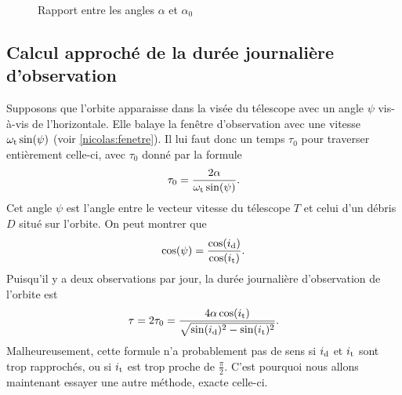 \begin{figure}
\begin{center}
\scriptsize
\def\figurewidth{0.6\linewidth}

\caption{Rapport entre les angles $\alpha$ et $\alpha_0$} \label{nicolas:alpha}
\end{center}
\end{figure}


\subsection{Calcul approché de la durée journalière d'observation}

Supposons que l'orbite apparaisse dans la visée du télescope avec un angle $\psi$ vis-à-vis de l'horizontale. Elle balaye la fenêtre d'observation avec une vitesse $\omega_\text{t} \sin(\psi)$ (voir \autoref{nicolas:fenetre}). Il lui faut donc un temps $\tau_0$ pour traverser entièrement celle-ci, avec $\tau_0$ donné par la formule
\[ \tau_0 = \frac{2\alpha}{\omega_\text{t} \sin(\psi)}.\]
Cet angle $\psi$ est l'angle entre le vecteur vitesse du télescope $T$ et celui d'un débris $D$ situé sur l'orbite. 
On peut montrer que
\[ 
\cos(\psi) = \frac{\cos(i_\text{d})}{\cos(i_\text{t})}.
\]
Puisqu'il y a deux observations par jour, la durée journalière d'observation de l'orbite est
\[ \tau = 2\tau_0 = \frac{4\alpha\cos(i_\text{t})}{\sqrt{\sin(i_\text{d})^2 - \sin(i_\text{t})^2}}.\]
Malheureusement, cette formule n'a probablement pas de sens si $i_\text{d}$ et $i_\text{t}$ sont trop rapprochés, ou si $i_\text{t}$ est trop proche de $\frac{\pi}{2}$. C'est pourquoi nous allons maintenant essayer une autre méthode, exacte celle-ci.

